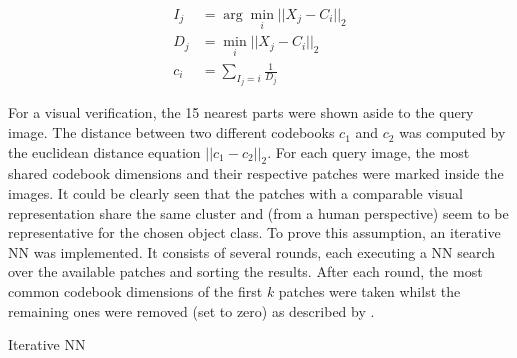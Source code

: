 %	

\begin{align}
	I_j &= \arg \min_i ||X_j - C_i||_2 \\
	D_j &= \min_i ||X_j - C_i||_2 \\
	c_i &= \sum_{I_j = i} \frac{1}{D_j}
	\label{eqn:codebook_calc}
\end{align}

For a visual verification, the 15 nearest parts were shown aside to the query image. The distance between two different codebooks $c_1$ and $c_2$ was computed by the euclidean distance equation $||c_1-c_2||_2$.
For each query image, the most shared codebook dimensions and their respective patches were marked inside the images. It could be clearly seen that the patches with a comparable visual representation share the same cluster and (from a human perspective) seem to be representative for the chosen object class.
To prove this assumption, an iterative \ac{NN} was implemented. It consists of several rounds, each executing a \ac{NN} search over the available patches and sorting the results. After each round, the most common codebook dimensions of the first $k$ patches were taken whilst the remaining ones were removed (set to zero) as described by .

\begin{algorithm}
	\caption{Iterative \ac{NN}}
	\label{alg:iterative_nn}
\end{algorithm}

